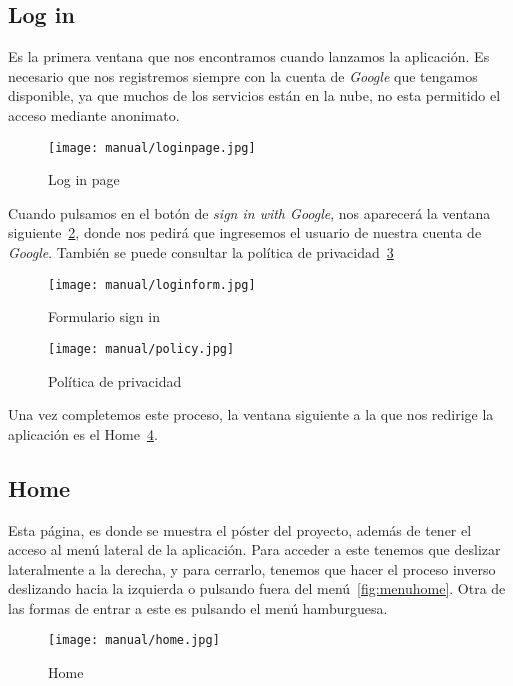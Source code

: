 \subsection{Log in}\label{login}
Es la primera ventana que nos encontramos cuando lanzamos la aplicación. Es necesario que nos registremos siempre con la cuenta de \emph{Google} que tengamos disponible, ya que muchos de los servicios están en la nube, no esta permitido el acceso mediante anonimato.

\begin{figure}[H]
	\centering
	\texttt{[image: manual/loginpage.jpg]}
	\caption{Log in page}\label{fig:loginpage}
\end{figure}

Cuando pulsamos en el botón de \emph{sign in with Google}, nos aparecerá la ventana siguiente~\ref{fig:formlog}, donde nos pedirá que ingresemos el usuario de nuestra cuenta de \emph{Google}. También se puede consultar la política de privacidad~\ref{fig:policy}

\begin{figure}[H]
	\centering
	\texttt{[image: manual/loginform.jpg]}
	\caption{Formulario sign in}\label{fig:formlog}
\end{figure}

\begin{figure}[H]
	\centering
	\texttt{[image: manual/policy.jpg]}
	\caption{Política de privacidad}\label{fig:policy}
\end{figure}

Una vez completemos este proceso, la ventana siguiente a la que nos redirige la aplicación es el Home~\ref{fig:homepage}.


\subsection{Home}\label{home}
Esta página, es donde se muestra el póster del proyecto, además de tener el acceso al menú lateral de la aplicación. Para acceder a este tenemos que deslizar lateralmente a la derecha, y para cerrarlo, tenemos que hacer el proceso inverso deslizando hacia la izquierda o pulsando fuera del menú~\ref{fig:menuhome}. Otra de las formas de entrar a este es pulsando el menú hamburguesa.

\begin{figure}[H]
	\centering
	\texttt{[image: manual/home.jpg]}
	\caption{Home}\label{fig:homepage}
\end{figure}

